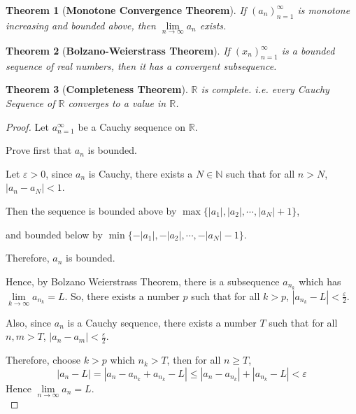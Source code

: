 \documentclass[12pt]{article}
\newcommand{\abs}[1]{\left| #1 \right|}
\theoremstyle{plain}
\newtheorem{theorem}{Theorem}[section]
\newcommand{\ep}{\varepsilon}
\newcommand{\dlim}{\displaystyle\lim\limits}
\begin{document}
	\begin{theorem}[\textbf{Monotone Convergence Theorem}]
		If $(a_n)_{n=1}^{\infty}$ is monotone increasing and bounded above, 
		then $\dlim_{n\to\infty} a_n$ exists.\\
	\end{theorem}
  
  \begin{theorem}[\textbf{Bolzano-Weierstrass Theorem}]
  	If $(x_n)_{n=1}^\infty$ is a bounded sequence of real numbers,
  	then it has a convergent subsequence. \\
  \end{theorem}

	\begin{theorem}[\textbf{Completeness Theorem}]
		$\mathbb{R}$ is complete. i.e. every Cauchy Sequence of 
		$\mathbb{R}$ converges to a value in $\mathbb{R}$.
	\end{theorem}
	\begin{proof}
		Let $a_{n=1}^{\infty}$ be a Cauchy sequence on $\mathbb{R}$.
		
		Prove first that $a_n$ is bounded. 
		
		Let $\ep>0$, 
		since $a_n$ is Cauchy, there exists a $N\in\mathbb{N}$ such that 
		for all $n > N$, $\abs{a_n-a_N}<1$. 

		Then the sequence is bounded above by 
		$\max\{\abs{a_1}, \abs{a_2}, \cdots, \abs{a_N}+1\}$, 
		
		and bounded below	by $\min\{-\abs{a_1}, -\abs{a_2},\cdots, -\abs{a_N}-1\}$.
		
		Therefore, $a_n$ is bounded. 

		Hence, by Bolzano Weierstrass Theorem, 
		there is a subsequence $a_{n_k}$ which has $\dlim_{k\to\infty}a_{n_k}=L$.
		So, there exists a number $p$ such that for all $k>p$,
		$\abs{a_{n_k}-L}<\frac{\ep}2$. 
		
		Also, since $a_n$ is a Cauchy sequence, there exists a number $T$ such 
		that for all $n,m>T$, $\abs{a_n-a_m}<\frac{\ep}2$. 

		Therefore, choose $k>p$ which $n_k>T$, then for all $n\geq T$, 
		\[
			\abs{a_n-L}=\abs{a_n-a_{n_k}+a_{n_k}-L}
			\leq \abs{a_n-a_{n_k}}+\abs{a_{n_k}-L}
			<\ep
		\]
		Hence $\dlim_{n\to\infty} a_n = L$. \\
	\end{proof}
\end{document}
